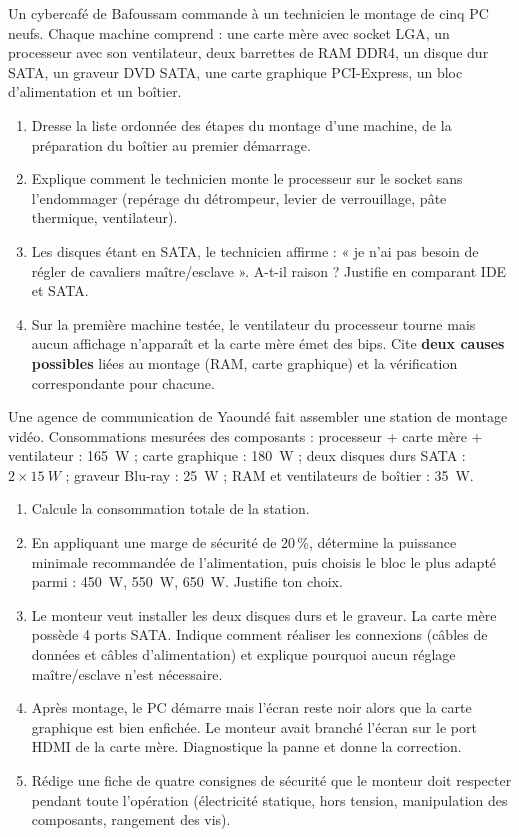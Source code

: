 \documentclass[11pt]{article}
\begin{document}
\begin{exercice}
Un cybercafé de Bafoussam commande à un technicien le montage de cinq PC neufs. Chaque machine comprend : une carte mère avec socket LGA, un processeur avec son ventilateur, deux barrettes de RAM DDR4, un disque dur SATA, un graveur DVD SATA, une carte graphique PCI-Express, un bloc d'alimentation et un boîtier.
\begin{enumerate}
  \item Dresse la liste ordonnée des étapes du montage d'une machine, de la préparation du boîtier au premier démarrage.
  \item Explique comment le technicien monte le processeur sur le socket sans l'endommager (repérage du détrompeur, levier de verrouillage, pâte thermique, ventilateur).
  \item Les disques étant en SATA, le technicien affirme : « je n'ai pas besoin de régler de cavaliers maître/esclave ». A-t-il raison ? Justifie en comparant IDE et SATA.
  \item Sur la première machine testée, le ventilateur du processeur tourne mais aucun affichage n'apparaît et la carte mère émet des bips. Cite \textbf{deux causes possibles} liées au montage (RAM, carte graphique) et la vérification correspondante pour chacune.
\end{enumerate}
\end{exercice}

\begin{exercice}
Une agence de communication de Yaoundé fait assembler une station de montage vidéo. Consommations mesurées des composants : processeur + carte mère + ventilateur : \SI{165}{W} ; carte graphique : \SI{180}{W} ; deux disques durs SATA : $2 \times \SI{15}{W}$ ; graveur Blu-ray : \SI{25}{W} ; RAM et ventilateurs de boîtier : \SI{35}{W}.
\begin{enumerate}
  \item Calcule la consommation totale de la station.
  \item En appliquant une marge de sécurité de 20\,\%, détermine la puissance minimale recommandée de l'alimentation, puis choisis le bloc le plus adapté parmi : \SI{450}{W}, \SI{550}{W}, \SI{650}{W}. Justifie ton choix.
  \item Le monteur veut installer les deux disques durs et le graveur. La carte mère possède 4 ports SATA. Indique comment réaliser les connexions (câbles de données et câbles d'alimentation) et explique pourquoi aucun réglage maître/esclave n'est nécessaire.
  \item Après montage, le PC démarre mais l'écran reste noir alors que la carte graphique est bien enfichée. Le monteur avait branché l'écran sur le port HDMI de la carte mère. Diagnostique la panne et donne la correction.
  \item Rédige une fiche de quatre consignes de sécurité que le monteur doit respecter pendant toute l'opération (électricité statique, hors tension, manipulation des composants, rangement des vis).
\end{enumerate}
\end{exercice}
\end{document}
